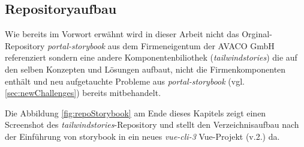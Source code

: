 \subsection{Repositoryaufbau}
\label{sec:repoaufbau}
Wie bereits im Vorwort erwähnt wird in dieser Arbeit nicht das Orginal-Repository \textit{portal-storybook} aus dem Firmeneigentum der AVACO GmbH referenziert sondern eine andere Komponentenbiliothek (\textit{tailwindstories}) die auf den selben Konzepten und Lösungen aufbaut, nicht die Firmenkomponenten enthält und neu aufgetauchte Probleme aus \textit{portal-storybook} (vgl. \ref{sec:newChallenges}) bereits mitbehandelt.

Die Abbildung \ref{fig:repoStorybook} am Ende dieses Kapitels zeigt einen Screenshot des \textit{tailwindstories}-Repository und stellt den Verzeichnisaufbau nach der Einführung von storybook in ein neues \textit{vue-cli-3} Vue-Projekt (v.2.) da.

